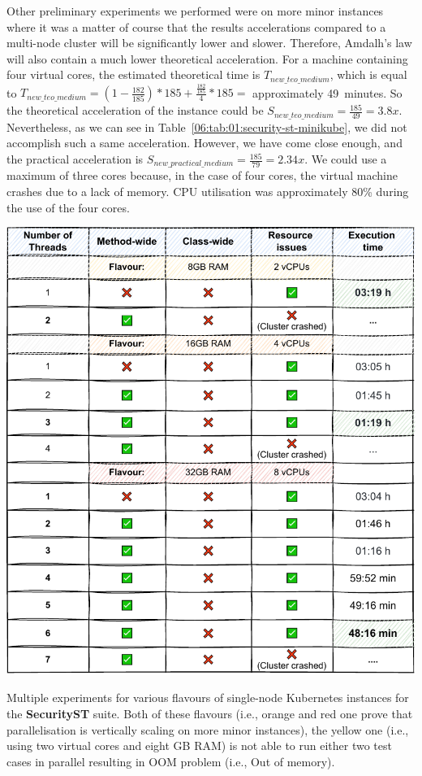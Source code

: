 Other preliminary experiments we performed were on more minor instances where it was a matter of course that the results
accelerations compared to a multi-node cluster will be significantly lower and slower.
Therefore, Amdalh's law will also contain a much lower theoretical acceleration.
For a machine containing four virtual cores, the estimated theoretical time is $T_{new\_teo\_medium}$, which is equal to
$T_{new\_teo\_medium} = (1 - \frac{182}{185}) * 185 + \frac{\frac{182}{185}} {4} * 185 = $ approximately 49~minutes.
So the theoretical acceleration of the instance could be $S_{new\_teo\_medium} = \frac{185}{49} = 3.8x$.
Nevertheless, as we can see in Table~\ref{06:tab:01:security-st-minikube}, we did not accomplish such a same acceleration.
However, we have come close enough, and the practical acceleration is $S_{new\_practical\_medium} = \frac{185}{79} = 2.34x$.
We could use a maximum of three cores because, in the case of four cores, the virtual machine crashes due to a lack of memory.
CPU utilisation was approximately 80\% during the use of the four cores.
\begin{table}[ht!]
    \centering
    \includegraphics[scale=0.8]{obrazky-figures/08-experiments/preliminary/06-exp-preliminary-minikube-b}
    \caption{Multiple experiments for various flavours of single-node Kubernetes instances for the
    \textbf{SecurityST} suite. Both of these flavours (i.e., orange and red one prove that parallelisation is
    vertically scaling on more minor instances), the yellow one (i.e., using two virtual cores and eight GB RAM)
        is not able to run either two test cases in parallel resulting in OOM problem (i.e., Out of memory).}
    \label{06:tab:01:security-st-minikube}
\end{table}

